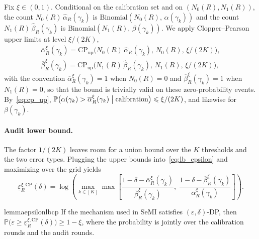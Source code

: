 \documentclass{article}
\theoremstyle{plain}
\theoremstyle{definition}
\theoremstyle{remark}
\renewcommand{\leq}{\leqslant}
\renewcommand{\geq}{\geqslant}
\newcommand{\bP}{\mathbb{P}}
\begin{document}
Fix $\xi \in (0,1)$. Conditional on the calibration set and on $(N_0(R), N_1(R))$, the count $N_0(R)\,\widehat{\alpha}_R(\gamma_k)$ is $\mathrm{Binomial}(N_0(R),\, \alpha(\gamma_k))$ and the count $N_1(R)\,\widehat{\beta}_R(\gamma_k)$ is $\mathrm{Binomial}(N_1(R),\, \beta(\gamma_k))$. We apply Clopper--Pearson upper limits at level $\xi/(2K)$,
\begin{align*}
    \overline{\alpha}_{R}^{\xi}(\gamma_k) = \mathrm{CP}_{\mathrm{up}}\bigl(N_0(R)\,\widehat{\alpha}_R(\gamma_k),\,N_0(R),\,\xi/(2K)\bigr), \\[2pt]
    \overline{\beta}_{R}^{\xi}(\gamma_k)  = \mathrm{CP}_{\mathrm{up}}\bigl(N_1(R)\,\widehat{\beta}_R(\gamma_k),\,N_1(R),\,\xi/(2K)\bigr),
\end{align*}
with the convention $\overline{\alpha}_{R}^{\xi}(\gamma_k) = 1$ when $N_0(R) = 0$ and $\overline{\beta}_{R}^{\xi}(\gamma_k) = 1$ when $N_1(R) = 0$, so that the bound is trivially valid on these zero-probability events. By~\eqref{eq:cp_up}, $\bP\bigl(\alpha(\gamma_k) > \overline{\alpha}_R^{\xi}(\gamma_k) \bigm| \text{calibration}\bigr) \leq \xi/(2K)$, and likewise for $\beta(\gamma_k)$.

\paragraph{Audit lower bound.} The factor $1/(2K)$ leaves room for a union bound over the $K$ thresholds and the two error types. Plugging the upper bounds into~\eqref{eq:lb_epsilon} and maximizing over the grid yields
\begin{equation}
    \underline{\varepsilon}_{R}^{\xi,\mathrm{CP}}(\delta) = \log\left(\max_{k \in [K]}\max\left[\frac{1 - \delta - \overline{\alpha}_R^{\xi}(\gamma_k)}{\overline{\beta}_R^\xi(\gamma_k)},\;\frac{1 - \delta - \overline{\beta}_R^\xi(\gamma_k)}{\overline{\alpha}_R^{\xi}(\gamma_k)}\right]\right). \label{eq:lb_epsilon_R_cp}
\end{equation}

\begin{restatable}{lemma}{epsilonlbcp}\label{lem:epsilonlb-cp}
    If the mechanism used in SeMI satisfies $(\varepsilon,\delta)$-DP, then $\bP\bigl(\varepsilon \geq \underline{\varepsilon}_{R}^{\xi,\mathrm{CP}}(\delta)\bigr) \geq 1 - \xi$, where the probability is jointly over the calibration rounds and the audit rounds.
\end{restatable}
\end{document}
